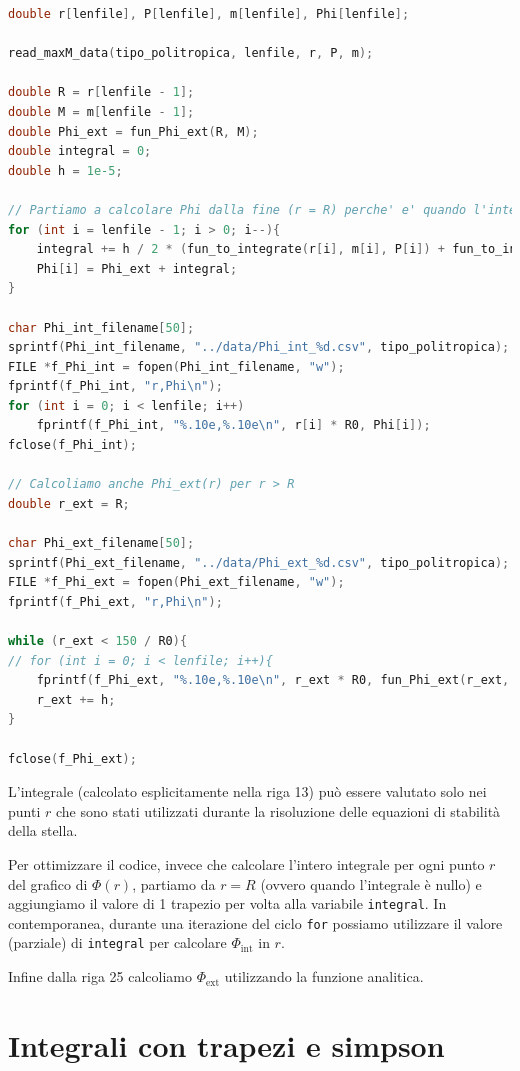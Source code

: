 \documentclass[a4paper, titlepage]{article}
\begin{document}
\begin{lstlisting}[language=C]
double r[lenfile], P[lenfile], m[lenfile], Phi[lenfile];

read_maxM_data(tipo_politropica, lenfile, r, P, m);

double R = r[lenfile - 1];
double M = m[lenfile - 1];
double Phi_ext = fun_Phi_ext(R, M);
double integral = 0;
double h = 1e-5;

// Partiamo a calcolare Phi dalla fine (r = R) perche' e' quando l'integrale e' piu' piccolo
for (int i = lenfile - 1; i > 0; i--){
    integral += h / 2 * (fun_to_integrate(r[i], m[i], P[i]) + fun_to_integrate(r[i - 1], m[i - 1], P[i - 1]));
    Phi[i] = Phi_ext + integral;
}

char Phi_int_filename[50];
sprintf(Phi_int_filename, "../data/Phi_int_%d.csv", tipo_politropica);
FILE *f_Phi_int = fopen(Phi_int_filename, "w");
fprintf(f_Phi_int, "r,Phi\n");
for (int i = 0; i < lenfile; i++)
    fprintf(f_Phi_int, "%.10e,%.10e\n", r[i] * R0, Phi[i]);
fclose(f_Phi_int);

// Calcoliamo anche Phi_ext(r) per r > R
double r_ext = R;

char Phi_ext_filename[50];
sprintf(Phi_ext_filename, "../data/Phi_ext_%d.csv", tipo_politropica);
FILE *f_Phi_ext = fopen(Phi_ext_filename, "w");
fprintf(f_Phi_ext, "r,Phi\n");

while (r_ext < 150 / R0){
// for (int i = 0; i < lenfile; i++){
    fprintf(f_Phi_ext, "%.10e,%.10e\n", r_ext * R0, fun_Phi_ext(r_ext, M));
    r_ext += h;
}

fclose(f_Phi_ext);
\end{lstlisting}

L'integrale (calcolato esplicitamente nella riga 13) può essere valutato solo nei punti $r$ che sono stati utilizzati durante la risoluzione delle equazioni di stabilità della stella.

Per ottimizzare il codice, invece che calcolare l'intero integrale per ogni punto $r$ del grafico di $\Phi(r)$, partiamo da $r = R$ (ovvero quando l'integrale è nullo) e aggiungiamo il valore di 1 trapezio per volta alla variabile \texttt{integral}. In contemporanea, durante una iterazione del ciclo \texttt{for} possiamo utilizzare il valore (parziale) di \texttt{integral} per calcolare $\Phi_\text{int}$ in $r$.

Infine dalla riga 25 calcoliamo $\Phi_\text{ext}$ utilizzando la funzione analitica.



\section{Integrali con trapezi e simpson} \label{ap:integrali}
\end{document}
